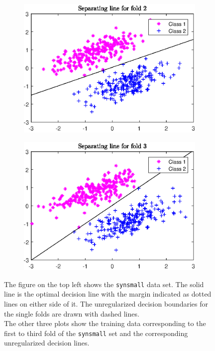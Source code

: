 \begin{figure}[ht]
\begin{subfigure}[t]{0.49\textwidth}
		\includegraphics[width=\textwidth]{Pictures/Plots/Fold_2.eps}
	\end{subfigure}%
	\hfill
	\begin{subfigure}[t]{0.49\textwidth}
			\includegraphics[width=\textwidth]{Pictures/Plots/Fold_3.eps}
	\end{subfigure}%
	\caption[Overfitting]{The figure on the top left shows the \textup{\texttt{synsmall}} data set. The solid line is the optimal decision line with the margin indicated as dotted lines on either side of it. The unregularized decision boundaries for the single folds are drawn with dashed lines. \\
	The other three plots show the training data corresponding to the first to third fold of the \textup{\texttt{synsmall}} set and the corresponding unregularized decision lines.}
	\label{fig_synsmall}
\end{figure}

